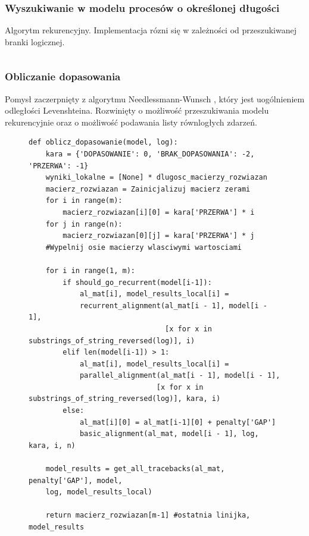 \subsubsection{Wyszukiwanie w modelu procesów o określonej długości}

Algorytm rekurencyjny. Implementacja rózni się w zależności od przeszukiwanej branki logicznej.
\begin{figure}[!ht]
\lstset{caption=Wyszukiwanie procesów o długości n, captionpos=b}
\lstset{label=src:get_n_length, frame=single}
\begin{lstlisting}
\end{lstlisting}
\end{figure}

\subsubsection{Obliczanie dopasowania}
Pomysł zaczerpnięty z algorytmu Needlessmann-Wunsch \cite{ea252fd3937a4a309a5e07e61e5531a7}, który jest uogólnieniem odległości Levenshteina. Rozwinięty o możliwość przeszukiwania modelu rekurencyjnie oraz o możliwość podawania listy równlogłych zdarzeń.
\begin{figure}[!ht]
\lstset{caption=Obliczanie dopasowania, captionpos=b}
\lstset{label=src:alignment_calculation, frame=single}
\begin{lstlisting}
def oblicz_dopasowanie(model, log):
    kara = {'DOPASOWANIE': 0, 'BRAK_DOPASOWANIA': -2, 'PRZERWA': -1}
    wyniki_lokalne = [None] * dlugosc_macierzy_rozwiazan
    macierz_rozwiazan = Zainicjalizuj macierz zerami
    for i in range(m):
        macierz_rozwiazan[i][0] = kara['PRZERWA'] * i
    for j in range(n):
        macierz_rozwiazan[0][j] = kara['PRZERWA'] * j
    #Wypelnij osie macierzy wlasciwymi wartosciami

    for i in range(1, m):
        if should_go_recurrent(model[i-1]):
            al_mat[i], model_results_local[i] = 
            recurrent_alignment(al_mat[i - 1], model[i - 1],
                                [x for x in substrings_of_string_reversed(log)], i)
        elif len(model[i-1]) > 1:
            al_mat[i], model_results_local[i] = 
            parallel_alignment(al_mat[i - 1], model[i - 1],
                              [x for x in substrings_of_string_reversed(log)], kara, i)
        else:
            al_mat[i][0] = al_mat[i-1][0] + penalty['GAP']
            basic_alignment(al_mat, model[i - 1], log, kara, i, n)

    model_results = get_all_tracebacks(al_mat, penalty['GAP'], model, 
    log, model_results_local)

    return macierz_rozwiazan[m-1] #ostatnia linijka, model_results
\end{lstlisting}
\end{figure}

